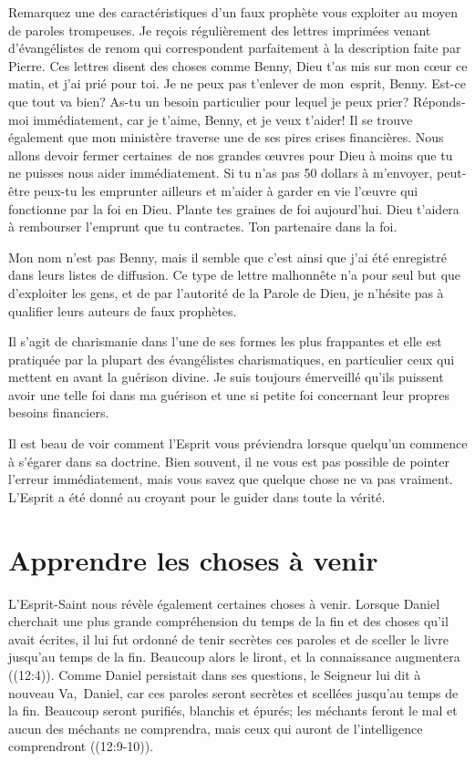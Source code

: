 Remarquez une des caractéristiques d'un faux prophète\frcolon{}
 \Og vous exploiter au moyen de paroles trompeuses. \Fg{}
 Je reçois régulièrement des lettres imprimées
 venant d'évangélistes de renom qui correspondent parfaitement
 à la description faite par Pierre.
 Ces lettres disent des choses comme\frcolon{}
 \Og Benny, Dieu t'as mis sur mon cœur ce matin, et j'ai prié pour toi.
 Je ne peux pas t'enlever de mon~esprit, Benny.
 Est-ce que tout va bien? As-tu un besoin particulier pour lequel je peux prier?
 Réponds-moi immédiatement, car je t'aime, Benny, et je veux t'aider!
 Il se trouve également que mon ministère traverse
 une de ses pires crises financières.
 Nous allons devoir fermer certaines~de nos grandes œuvres pour Dieu
 à moins que tu ne puisses nous aider immédiatement.
 Si tu n'as pas 50 dollars à m'envoyer, peut-être peux-tu les emprunter
 ailleurs et m'aider à garder en vie l'œuvre qui fonctionne par la foi en Dieu.
 Plante tes graines de foi aujourd'hui.
 Dieu t'aidera à rembourser l'emprunt que tu contractes.
 Ton partenaire dans la foi. \Fg{}

Mon nom n'est pas Benny, mais il semble que c'est ainsi que j'ai été enregistré
 dans leurs listes de diffusion.
 Ce type de lettre malhonnête n'a pour seul but que d'exploiter les gens,
 et de par l'autorité de la Parole de Dieu,
 je n'hésite pas à qualifier leurs auteurs de faux prophètes.

Il s'agit de charismanie dans l'une de ses formes les plus frappantes
 et elle est pratiquée par la plupart des évangélistes charismatiques,
 en particulier ceux qui mettent en avant la guérison divine.
 Je suis toujours émerveillé qu'ils puissent avoir une telle foi
 dans ma guérison et une si petite foi concernant leur propres besoins financiers.

Il est beau de voir comment l'Esprit vous préviendra
 lorsque quel\-qu'un commence à s'égarer dans sa doctrine.
 Bien souvent, il ne vous est pas possible de pointer l'erreur immédiatement,
 mais vous savez que quelque chose ne va pas vraiment.
 L'Esprit a été donné au croyant pour le guider dans toute la vérité.


\section{Apprendre les choses \`a venir}

L'Esprit-Saint nous révèle également certaines choses à venir.
 Lorsque Daniel cherchait une plus grande compréhension du temps de la fin
 et des choses qu'il avait écrites, il lui fut ordonné de
 \Og tenir secrètes ces paroles et de sceller le livre
 jusqu'au temps de la fin.
 Beaucoup alors le liront, et la connaissance augmentera \Fg{}
 ((12:4)).
 Comme Daniel persistait dans ses questions, le Seigneur lui dit à nouveau\frcolon{}
 \Og Va,~Daniel, car ces paroles seront secrètes
 et scellées jusqu'au temps de la fin.
 Beaucoup seront purifiés, blanchis et épurés;
 les méchants feront le mal et aucun des méchants ne comprendra,
 mais ceux qui auront de l'intelligence comprendront \Fg{}
 ((12:9-10)).

